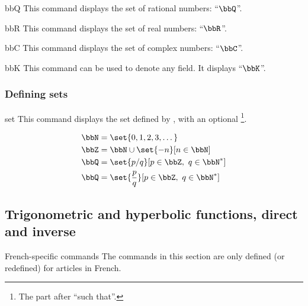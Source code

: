 \documentclass[english,nolocaltoc]{nwejmart}
\newtheorem[style=definition]{fact}
\newtheorem[title-plural=Criteria]{criterion}
\newtheorem[title=random experiment]{rexp}
\begin{document}
\begin{docCommand}{bbQ}{}
  This  command displays the set of rational numbers: \enquote{$\bbQ$}.
\end{docCommand}

\begin{docCommand}{bbR}{}
  This  command displays the set of real numbers: \enquote{$\bbR$}.
\end{docCommand}

\begin{docCommand}{bbC}{}
  This  command displays the set of complex numbers: \enquote{$\bbC$}.
\end{docCommand}

\begin{docCommand}{bbK}{}
  This command can be used to denote any field. It displays \enquote{$\bbK$}.
\end{docCommand}

\subsubsection{Defining sets}

\begin{docCommand}[doc updated=2019-03-18]{set}{}
  This  command displays the set defined by , with an
  optional  \footnote{The part after
    \enquote{such that}.}.
\begin{bodycode}
\begin{align}
  \bbN & = \set{0,1,2,3,\dots}              \\
  \bbZ & = \bbN\cup\set{-n}[n\in\bbN]       \\
  \bbQ & = \set{p/q}[p\in\bbZ,\ q\in\bbN^*] \\
  \bbQ & = \set{\frac{p}{q}}[p\in\bbZ,\ q\in\bbN^*]
\end{align}
\end{bodycode}
\end{docCommand}

\subsection[Trigonometric and hyperbolic functions]{Trigonometric and
  hyperbolic functions, direct and inverse}

\begin{dbremark}{French-specific commands}{}
  The commands in this section are only defined  (or redefined) for articles in French.
\end{dbremark}
\end{document}
